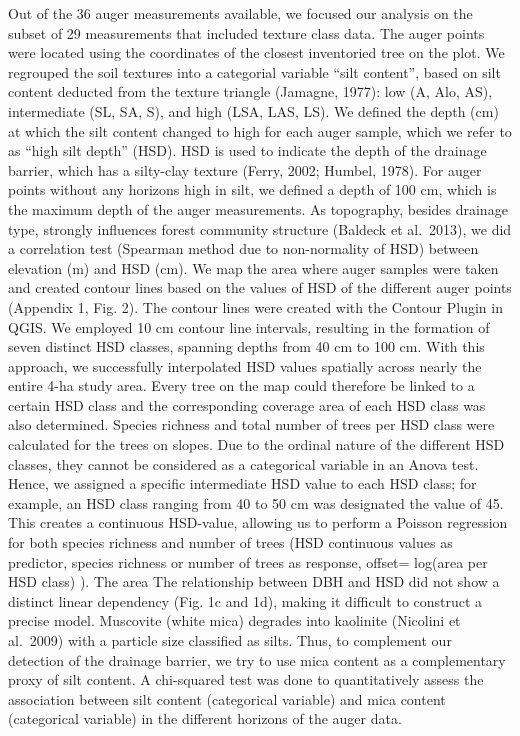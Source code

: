 \documentclass[fleqn,10pt]{latex/stylish_article} %
\begin{document}
Out of the 36 auger measurements available, we focused our analysis on the subset of 29 measurements that included texture class data. The auger points were located using the coordinates of the closest inventoried tree on the plot. We regrouped the soil textures into a categorial variable \enquote{silt content}, based on silt content deducted from the texture triangle (Jamagne, 1977): low (A, Alo, AS), intermediate (SL, SA, S), and high (LSA, LAS, LS). We defined the depth (cm) at which the silt content changed to high for each auger sample, which we refer to as \enquote{high silt depth} (HSD). HSD is used to indicate the depth of the drainage barrier, which has a silty-clay texture (Ferry, 2002; Humbel, 1978). For auger points without any horizons high in silt, we defined a depth of 100 cm, which is the maximum depth of the auger measurements. As topography, besides drainage type, strongly influences forest community structure (Baldeck et al.~2013), we did a correlation test (Spearman method due to non-normality of HSD) between elevation (m) and HSD (cm).
We map the area where auger samples were taken and created contour lines based on the values of HSD of the different auger points (Appendix 1, Fig. 2). The contour lines were created with the Contour Plugin in QGIS. We employed 10 cm contour line intervals, resulting in the formation of seven distinct HSD classes, spanning depths from 40 cm to 100 cm. With this approach, we successfully interpolated HSD values spatially across nearly the entire 4-ha study area. Every tree on the map could therefore be linked to a certain HSD class and the corresponding coverage area of each HSD class was also determined.
Species richness and total number of trees per HSD class were calculated for the trees on slopes. Due to the ordinal nature of the different HSD classes, they cannot be considered as a categorical variable in an Anova test. Hence, we assigned a specific intermediate HSD value to each HSD class; for example, an HSD class ranging from 40 to 50 cm was designated the value of 45. This creates a continuous HSD-value, allowing us to perform a Poisson regression for both species richness and number of trees (HSD continuous values as predictor, species richness or number of trees as response, offset= log(area per HSD class) ). The area The relationship between DBH and HSD did not show a distinct linear dependency (Fig. 1c and 1d), making it difficult to construct a precise model.
Muscovite (white mica) degrades into kaolinite (Nicolini et al.~2009) with a particle size classified as silts. Thus, to complement our detection of the drainage barrier, we try to use mica content as a complementary proxy of silt content. A chi-squared test was done to quantitatively assess the association between silt content (categorical variable) and mica content (categorical variable) in the different horizons of the auger data.
\end{document}
